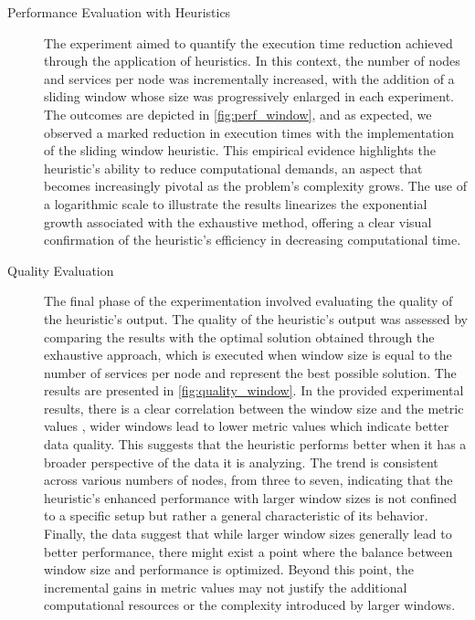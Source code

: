 \begin{description}
  \item[Performance Evaluation with Heuristics]
        The experiment aimed to quantify the execution time reduction achieved through the application of heuristics.
        In this context, the number of nodes and services per node was incrementally increased,
        with the addition of a sliding window whose size was progressively enlarged in each experiment.
        The outcomes are depicted in \cref{fig:perf_window}, and as expected,
        we observed a marked reduction in execution times with the implementation of the sliding window heuristic.
        This empirical evidence highlights the heuristic's ability to reduce computational demands,
        an aspect that becomes increasingly pivotal as the problem's complexity grows.
        The use of a logarithmic scale to illustrate the results linearizes the exponential growth associated with the exhaustive method,
        offering a clear visual confirmation of the heuristic's efficiency in decreasing computational time.
  \item[Quality Evaluation] The final phase of the experimentation involved evaluating the quality of the heuristic's output.
        The quality of the heuristic's output was assessed by comparing the results with the optimal solution obtained through the exhaustive approach,
        which is executed when window size is equal to the number of services per node and represent the best possible solution.
        The results are presented in \cref{fig:quality_window}.
        In the provided experimental results, there is a clear correlation between the window size and the metric values
        , wider windows  lead to lower metric values which indicate better data quality.
        This suggests that the heuristic performs better when it has a broader perspective of the data it is analyzing.
        The trend is consistent across various numbers of nodes, from three to seven, indicating that the heuristic's enhanced
        performance with larger window sizes is not confined to a specific setup but rather a general characteristic of its behavior.
        Finally, the data suggest that while larger window sizes generally lead to better performance,
        there might exist a point where the balance between window size and performance is optimized.
        Beyond this point, the incremental gains in metric values may not justify the additional computational resources or the complexity introduced by larger windows.

\end{description}


